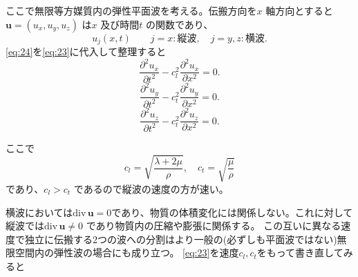 \documentclass[dvipdfmx,11pt]{jsreport}
\numberwithin{equation}{chapter}
\numberwithin{table}{chapter}
\begin{document}
ここで無限等方媒質内の弾性平面波を考える。伝搬方向を$x$ 軸方向とすると
$\bm{u}=(u_x,u_y,u_z)$ は$x$ 及び時間$t$ の関数であり、
\begin{equation}
\label{eq:24}
	u_j(x,t)\qquad j=x:\text{縦波},\quad j=y,z:\text{横波}
.\end{equation}
\eqref{eq:24}を\eqref{eq:23}に代入して整理すると
\begin{equation}
\label{eq:25}
	\frac{\partial ^2u_x}{\partial t^2} -c_l^2 \frac{\partial ^2u_x}{\partial x^2} =0.\end{equation}
\begin{equation}
\label{eq:26}
	\frac{\partial ^2u_y}{\partial t^2} -c_t^2 \frac{\partial ^2u_y}{\partial x^2} =0
.\end{equation}
\begin{equation}
\label{eq:27}
	\frac{\partial ^2u_z}{\partial t^2} -c_t^2 \frac{\partial ^2u_z}{\partial x^2} =0.\end{equation}

ここで
\begin{equation}
\label{eq:28}
	c_l=\sqrt{\frac{\lambda+2\mu}{\rho}} ,\quad c_t=\sqrt{\frac{\mu}{\rho}} 
\end{equation}
であり、$c_l>c_t$ であるので縦波の速度の方が速い。

横波においては$\mathrm{div}\,\bm{u}=0$であり、物質の体積変化には関係しない。これに対して縦波では$\mathrm{div}\,\bm{u}\neq 0$
であり物質内の圧縮や膨張に関係する。
この互いに異なる速度で独立に伝搬する2つの波への分割はより一般の(必ずしも平面波ではない)無限空間内の弾性波の場合にも成り立つ。
\eqref{eq:23}を速度$c_l,c_t$をもって書き直してみると
\end{document}

